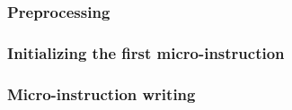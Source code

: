 \subsubsection{Preprocessing}                                       \label{mmu: instructions: trivial modexp parameter: preprocessing}                    
\subsubsection{Initializing the first micro-instruction}            \label{mmu: instructions: trivial modexp parameter: initialization}                   
\subsubsection{Micro-instruction writing}                           \label{mmu: instructions: trivial modexp parameter: micro instruction writing}        
